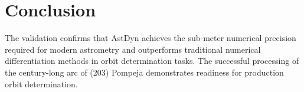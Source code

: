 \section{Conclusion}
The validation confirms that AstDyn achieves the sub-meter numerical precision required for modern astrometry and outperforms traditional numerical differentiation methods in orbit determination tasks. The successful processing of the century-long arc of (203) Pompeja demonstrates readiness for production orbit determination.
